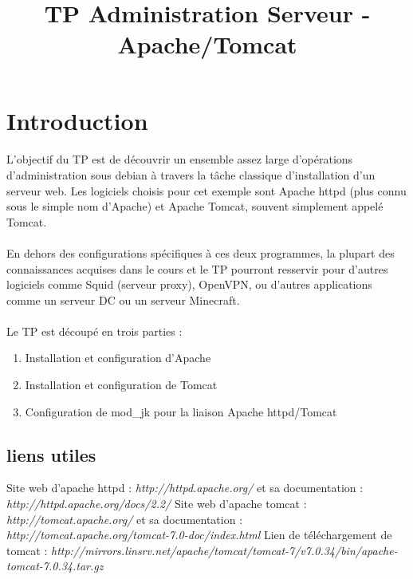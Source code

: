\documentclass[12pt,a4paper]{article}
\title{TP Administration Serveur - Apache/Tomcat}
\begin{document}
\maketitle{}

\section{Introduction}
\paragraph{}
L'objectif du TP est de découvrir un ensemble assez large d'opérations d'administration sous debian à travers la tâche classique d'installation d'un serveur web. Les logiciels choisis pour cet exemple sont Apache httpd (plus connu sous le simple nom d'Apache) et Apache Tomcat, souvent simplement appelé Tomcat.

\paragraph{}
En dehors des configurations spécifiques à ces deux programmes, la plupart des connaissances acquises dans le cours et le TP pourront resservir pour d'autres logiciels comme Squid (serveur proxy), OpenVPN, ou d'autres applications comme un serveur DC ou un serveur Minecraft.

\paragraph{}
Le TP est découpé en trois parties : 
\begin{enumerate}
    \item Installation et configuration d'Apache
    \item Installation et configuration de Tomcat
    \item Configuration de mod\_jk pour la liaison Apache httpd/Tomcat
\end{enumerate}

\subsection{liens utiles}
    
Site web d'apache httpd : \textit{http://httpd.apache.org/} et sa documentation : \textit{http://httpd.apache.org/docs/2.2/}
Site web d'apache tomcat : \textit{http://tomcat.apache.org/} et sa documentation : \textit{http://tomcat.apache.org/tomcat-7.0-doc/index.html}
Lien de téléchargement de tomcat : \textit{http://mirrors.linsrv.net/apache/tomcat/tomcat-7/v7.0.34/bin/apache-tomcat-7.0.34.tar.gz}
\end{document}
